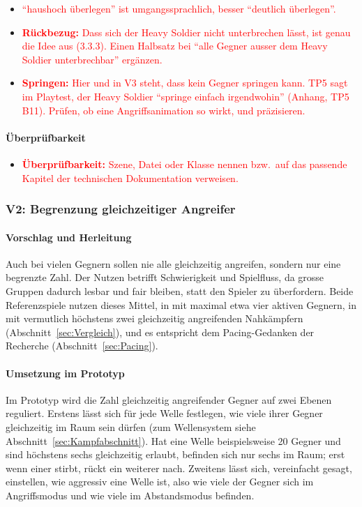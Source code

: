 \documentclass[../Main.tex]{subfiles}
\begin{document}
\begin{itemize}[leftmargin=1.5cm]
    \item \textcolor{red}{\enquote{haushoch überlegen} ist umgangssprachlich, besser \enquote{deutlich überlegen}.}
    \item \textcolor{red}{\textbf{Rückbezug:} Dass sich der Heavy Soldier nicht unterbrechen lässt, ist genau die Idee aus  (3.3.3). Einen Halbsatz bei \enquote{alle Gegner ausser dem Heavy Soldier unterbrechbar} ergänzen.}
    \item \textcolor{red}{\textbf{Springen:} Hier und in V3 steht, dass kein Gegner springen kann. TP5 sagt im Playtest, der Heavy Soldier \enquote{springe einfach irgendwohin} (Anhang, TP5 B11). Prüfen, ob eine Angriffsanimation so wirkt, und präzisieren.}
\end{itemize}

\paragraph{Überprüfbarkeit}
\begin{itemize}[leftmargin=1.5cm]
    \item \textcolor{red}{\textbf{Überprüfbarkeit:} Szene, Datei oder Klasse nennen bzw.\ auf das passende Kapitel der technischen Dokumentation verweisen.}
\end{itemize}

\subsubsection{V2: Begrenzung gleichzeitiger Angreifer} \label{sec:V2}

\paragraph{Vorschlag und Herleitung}
Auch bei vielen Gegnern sollen nie alle gleichzeitig angreifen, sondern nur eine begrenzte Zahl. Der Nutzen betrifft Schwierigkeit und Spielfluss, da grosse Gruppen dadurch lesbar und fair bleiben, statt den Spieler zu überfordern. Beide Referenzspiele nutzen dieses Mittel, in  mit maximal etwa vier aktiven Gegnern, in  mit vermutlich höchstens zwei gleichzeitig angreifenden Nahkämpfern (Abschnitt~\ref{sec:Vergleich}), und es entspricht dem Pacing-Gedanken der Recherche (Abschnitt~\ref{sec:Pacing}).

\paragraph{Umsetzung im Prototyp}
Im Prototyp wird die Zahl gleichzeitig angreifender Gegner auf zwei Ebenen reguliert. Erstens lässt sich für jede Welle festlegen, wie viele ihrer Gegner gleichzeitig im Raum sein dürfen (zum Wellensystem siehe Abschnitt~\ref{sec:Kampfabschnitt}). Hat eine Welle beispielsweise 20 Gegner und sind höchstens sechs gleichzeitig erlaubt, befinden sich nur sechs im Raum; erst wenn einer stirbt, rückt ein weiterer nach. Zweitens lässt sich, vereinfacht gesagt, einstellen, wie aggressiv eine Welle ist, also wie viele der Gegner sich im Angriffsmodus und wie viele im Abstandsmodus befinden.
\end{document}
